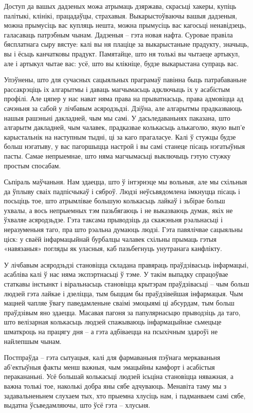 Доступ да вашых дадзеных можа атрымаць дзяржава, скрасьці хакеры, купіць палітыкі, клінікі, працадаўцы, страхавыя. Выкарыстоўваючы вашыя дадзеныя, можна прымусіць вас купляць нешта, можна прымусіць вас кагосьці ненавідзець, галасаваць патрэбным чынам. Дадзеныя – гэта новая нафта. Суровае правіла бясплатнага сыру вястуе: калі вы ня плаціце за выкарыстаньне прадукту, значыць, вы і ёсьць канчатковы прадукт. Памятайце, што ня толькі вы чытаеце артыкул, але і артыкул чытае вас: усё, што вы клікніце, будзе выкарыстана супраць вас.

Упэўнены, што для сучасных сацыяльных праграмаў павінна быць патрабаваньне рассакрэціць іх алгарытмы і даваць магчымасьць адключыць іх у асабістым профілі. Але цяпер у нас нават няма права на прыватнасьць, права адмовіцца ад сачэньня за сабой у лічбавым асяродзьдзі. Дзіўна, але алгарытмы прадказваюць нашыя рашэньні дакладней, чым мы самі. У дасьледаваньнях паказана, што алгарытм дакладней, чым чалавек, прадказвае колькасьць алькаголю, якую вып'е карыстальнік на наступным тыдні, ці за каго прагаласуе. Калі ў стужцы будзе больш нэгатыву, у вас пагоршыцца настрой і вы самі станеце пісаць нэгатыўныя пасты. Самае непрыемнае, што няма магчымасьці выключыць гэтую стужку простым спосабам.

Сьпіраль маўчаньня. Нам здаецца, што ў інтэрнэце мы вольныя, але мы схільныя да ўплыву сваіх падпісчыкаў і сяброў. Людзі неўсьвядомлена імкнуцца пісаць і посьціць тое, што атрымлівае большую колькасьць лайкаў і зьбірае больш ухвалы, а вось непрыемных тэм пазьбягаюць і не выказваюць думак, якіх не ўхваляе асяродзьдзе. Гэта таксама прыводзіць да скажэньня рэальнасьці і неразуменьня таго, пра што рэальна думаюць людзі. Гэта павялічвае сацыяльны ціск: у сваёй інфармацыйнай бурбалцы чалавек схільны прымаць гэтыя «навязаныя» погляды як уласныя, каб пазьбегнуць унутранага канфлікту.

У лічбавым асяродзьдзі становіцца складана правяраць праўдзівасьць інфармацыі, асабліва калі ў нас няма экспэртнасьці ў тэме. У такім выпадку спрацоўвае статкавы інстынкт і віральнасьць становіцца крытэрам праўдзівасьці – чым больш людзей гэта лайкае і дзеліцца, тым быццам бы праўдзівейшая інфармацыя. Чым мацней чапляе ўвагу паведамленьне сваімі эмоцыямі ці абсурдам, тым больш праўдзівым яно здаецца. Масавая пагоня за папулярнасьцю прыводзіць да таго, што велізарная колькасьць людзей спажываюць інфармацыйнае сьмецьце шматкроць на працягу дня – а гэта адбіваецца на псыхічным здароўі не найлепшым чынам.

Постпраўда – гэта сытуацыя, калі для фармаваньня пэўнага меркаваньня аб'ектыўныя факты менш важныя, чым эмацыйны камфорт і асабістыя перакананьні. Усё большай колькасьці людзей ісьціна становіцца няважная, а важна толькі тое, наколькі добра яны сябе адчуваюць. Менавіта таму мы з задавальненьнем слухаем тых, хто прыемна хлусіць нам, і падманваем самі сябе, выдатна ўсьведамляючы, што ўсё гэта – хлусьня.

